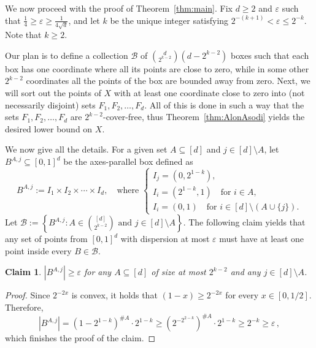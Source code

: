 \documentclass[11pt]{article}
\newtheorem{claim}{Claim}
\newcommand{\eps}{\varepsilon}
\newcommand{\cB}{\mathcal{B}}
\begin{document}
We now proceed with the proof of Theorem~\ref{thm:main}.
Fix $d\ge2$ and $\eps$ such that $\frac14 \ge \eps \ge \frac1{4\sqrt{d}}$,
and let $k$ be the unique integer satisfying $2^{-(k+1)} < \eps \le 2^{-k}$.
Note that $k\ge2$.

Our plan is to define a collection $\cB$ of $\binom{d}{2^{k-2}}\left(d-2^{k-2}\right)$ boxes such that
each box has one coordinate where all its points are close to zero,
while in some other $2^{k-2}$ coordinates all the points of the box are bounded away from zero.
Next, we will sort out the points of $X$ with at least one coordinate close to zero into (not necessarily disjoint) sets $F_1,F_2,\ldots,F_d$.
All of this is done in such a way that the sets $F_1,F_2,\ldots,F_d$ are $2^{k-2}$-cover-free, thus Theorem~\ref{thm:AlonAsodi} yields the desired lower bound on $X$.

We now give all the details.
For a given set $A \subseteq [d]$ and $j \in [d]\setminus A$, let $B^{A,j} \subseteq [0,1]^d$ be the axes-parallel box
defined as
\[
B^{A,j}:=I_1 \times I_2 \times \cdots \times I_d, \quad \mbox{where }  \begin{cases}
  I_j =(0,2^{1-k}), \\
  I_i =(2^{1-k},1) \quad \mbox {for } i \in A, \\
  I_i =(0,1) \quad \mbox{for } i \in [d] \setminus \left(A \cup\{j\}\right).
\end{cases}
\]
Let $\cB := \left\{ B^{A,j} : A \in \binom{[d]}{2^{k-2}} \mbox { and } j\in[d]\setminus A \right\}.$ 
The following claim yields that any set of points from $[0,1]^d$ with dispersion at most $\eps$ must have at least one point inside every $B \in \cB$.
\begin{claim}
$\left|B^{A,j}\right| \ge \eps$ for any $A \subseteq [d]$ of size at most $2^{k-2}$ and any $j\in [d]\setminus A$.
\end{claim}
\begin{proof}
Since $2^{-2x}$ is convex, it holds that $(1-x) \ge 2^{-2x}$ for every $x\in[0,1/2]$.
Therefore,
\[
\left|B^{A,j}\right| = \left(1-2^{1-k}\right)^{\# A} \cdot 2^{1-k} \ge \left(2^{-2^{2-k}}\right)^{\# A} \cdot 2^{1 - k} \ge 2^{-k} \ge \eps
\,,\]
which finishes the proof of the claim.
\end{proof}
\end{document}
